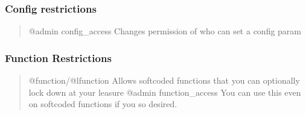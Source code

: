 \documentclass[letterpaper,10pt,english]{sphinxmanual}
\begin{document}
\subsubsection{Config restrictions}
\label{\detokenize{security:config-restrictions}}\begin{quote}

\sphinxAtStartPar
@admin config\_access \sphinxhyphen{} Changes permission of who can set a config param
\end{quote}


\subsubsection{Function Restrictions}
\label{\detokenize{security:function-restrictions}}\begin{quote}

\sphinxAtStartPar
@function/@lfunction \textendash{} Allows softcoded functions that you can optionally lock down at your leasure
@admin function\_access \textendash{} You can use this even on softcoded functions if you so desired.
\end{quote}
\end{document}
